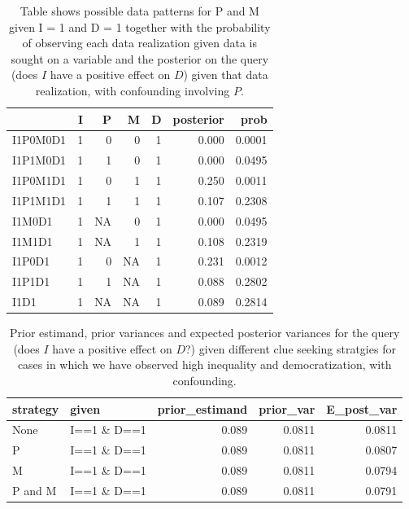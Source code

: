 \documentclass[12pt,]{book}
\begin{document}
\begin{table}[t]

\caption{\label{tab:unnamed-chunk-70}\label{possible_outcomespimd_conf} Table shows possible data patterns for P and M given I = 1 and D = 1 together with the probability of observing each data realization given data is sought on a variable and the posterior on the query (does $I$ have a positive effect on $D$) given that data realization, with confounding involving $P$.}
\centering
\begin{tabular}{l|r|r|r|r|r|r}
\hline
  & I & P & M & D & posterior & prob\\
\hline
I1P0M0D1 & 1 & 0 & 0 & 1 & 0.000 & 0.0001\\
\hline
I1P1M0D1 & 1 & 1 & 0 & 1 & 0.000 & 0.0495\\
\hline
I1P0M1D1 & 1 & 0 & 1 & 1 & 0.250 & 0.0011\\
\hline
I1P1M1D1 & 1 & 1 & 1 & 1 & 0.107 & 0.2308\\
\hline
I1M0D1 & 1 & NA & 0 & 1 & 0.000 & 0.0495\\
\hline
I1M1D1 & 1 & NA & 1 & 1 & 0.108 & 0.2319\\
\hline
I1P0D1 & 1 & 0 & NA & 1 & 0.231 & 0.0012\\
\hline
I1P1D1 & 1 & 1 & NA & 1 & 0.088 & 0.2802\\
\hline
I1D1 & 1 & NA & NA & 1 & 0.089 & 0.2814\\
\hline
\end{tabular}
\end{table}

\begin{table}[t]

\caption{\label{tab:unnamed-chunk-71}\label{pimdlearn_i1d1con}Prior estimand, prior variances and expected posterior variances for the query (does $I$ have a positive effect on $D$?) given different  clue seeking  stratgies for cases in which we have observed high inequality and democratization, with confounding.}
\centering
\begin{tabular}{l|l|r|r|r}
\hline
strategy & given & prior\_estimand & prior\_var & E\_post\_var\\
\hline
None & I==1 \& D==1 & 0.089 & 0.0811 & 0.0811\\
\hline
P & I==1 \& D==1 & 0.089 & 0.0811 & 0.0807\\
\hline
M & I==1 \& D==1 & 0.089 & 0.0811 & 0.0794\\
\hline
P and M & I==1 \& D==1 & 0.089 & 0.0811 & 0.0791\\
\hline
\end{tabular}
\end{table}
\end{document}
